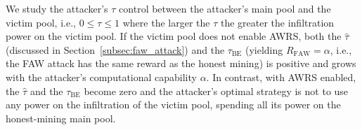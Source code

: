 We study the attacker's $\tau$ control between the attacker's main pool and the victim pool, i.e., $0 \leq \tau \leq 1$ where the larger the $\tau$ the greater the infiltration power on the victim pool.
If the victim pool does not enable AWRS, both the $\hat{\tau}$ (discussed in Section~\ref{subsec:faw_attack}) and the $\tau_{\mbox{BE}}$ (yielding $R_{\mbox{FAW}} = \alpha$, i.e., the FAW attack has the same reward as the honest mining) is positive and grows with the attacker's computational capability $\alpha$.
In contrast, with AWRS enabled, the $\hat{\tau}$ and the $\tau_{\mbox{BE}}$ become zero
and the attacker's optimal strategy is not to use any power on the infiltration of the victim pool,
spending all its power on the honest-mining main pool.

